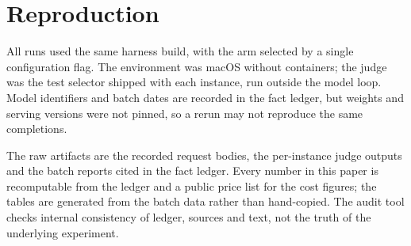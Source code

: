 \section{Reproduction}

All runs used the same harness build, with the arm selected by a single configuration flag. The environment was macOS without containers; the judge was the test selector shipped with each instance, run outside the model loop. Model identifiers and batch dates are recorded in the fact ledger, but weights and serving versions were not pinned, so a rerun may not reproduce the same completions.

The raw artifacts are the recorded request bodies, the per-instance judge outputs and the batch reports cited in the fact ledger. Every number in this paper is recomputable from the ledger and a public price list for the cost figures; the tables are generated from the batch data rather than hand-copied. The audit tool checks internal consistency of ledger, sources and text, not the truth of the underlying experiment.
